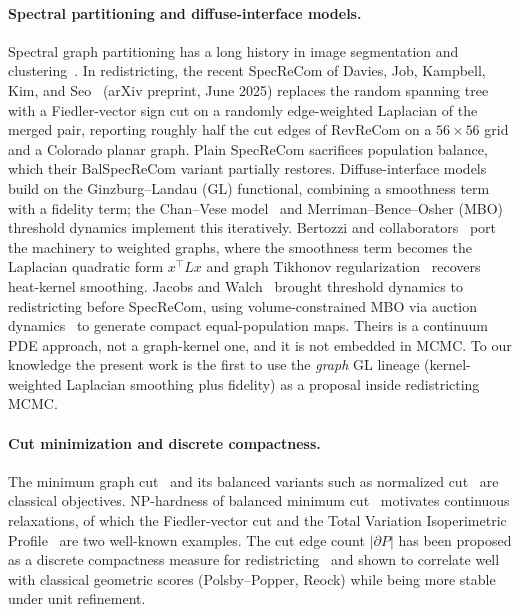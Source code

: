 \documentclass[11pt]{article}
\begin{document}
\paragraph{Spectral partitioning and diffuse-interface models.}\label{sec:related-spectral}

Spectral graph partitioning has a long history in image segmentation
and clustering~\cite{shi2000normalized}. In redistricting, the recent
SpecReCom of Davies, Job, Kampbell, Kim, and
Seo~\cite{davies2025spectral} (arXiv preprint, June 2025) replaces the
random spanning tree with a Fiedler-vector sign cut on a randomly
edge-weighted Laplacian of the merged pair, reporting roughly half the
cut edges of RevReCom on a $56 \times 56$ grid and a Colorado planar
graph. Plain SpecReCom sacrifices population balance, which their
BalSpecReCom variant partially restores. Diffuse-interface models
build on the Ginzburg--Landau (GL) functional, combining a smoothness
term with a fidelity term; the Chan--Vese model~\cite{chan2001active}
and Merriman--Bence--Osher (MBO) threshold dynamics implement this
iteratively. Bertozzi and collaborators~\cite{bertozzi2012diffuse,
merkurjev2013mbo} port the machinery to weighted graphs, where the
smoothness term becomes the Laplacian quadratic form $x^\top L x$ and
graph Tikhonov regularization~\cite{pilavci2021graph,shuman2013emerging}
recovers heat-kernel smoothing. Jacobs and Walch~\cite{jacobs2018pde}
brought threshold dynamics to redistricting before SpecReCom, using
volume-constrained MBO via auction dynamics~\cite{jacobs2018auction}
to generate compact equal-population maps. Theirs is a continuum PDE
approach, not a graph-kernel one, and it is not embedded in MCMC. To our
knowledge the present work is the first to use the \emph{graph} GL
lineage (kernel-weighted Laplacian smoothing plus fidelity) as a
proposal inside redistricting MCMC.

\paragraph{Cut minimization and discrete compactness.}\label{sec:related-cut}

The minimum graph cut~\cite{stoer1997simple,karger2000minimum} and its
balanced variants such as normalized cut~\cite{shi2000normalized} are
classical objectives. NP-hardness of balanced minimum
cut~\cite{wagner1993between} motivates continuous relaxations, of
which the Fiedler-vector cut and the Total Variation Isoperimetric
Profile~\cite{deford2019total} are two well-known examples. The cut
edge count $|\partial P|$ has been proposed as a discrete compactness
measure for redistricting~\cite{duchin2018discrete} and shown to
correlate well with classical geometric scores (Polsby--Popper, Reock)
while being more stable under unit refinement.
\end{document}
